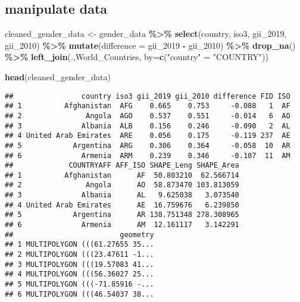 \documentclass[
]{article}
\newenvironment{Shaded}{\begin{snugshade}}{\end{snugshade}}
\newcommand{\AttributeTok}[1]{\textcolor[rgb]{0.13,0.29,0.53}{#1}}
\newcommand{\FunctionTok}[1]{\textcolor[rgb]{0.13,0.29,0.53}{\textbf{#1}}}
\newcommand{\NormalTok}[1]{#1}
\newcommand{\OtherTok}[1]{\textcolor[rgb]{0.56,0.35,0.01}{#1}}
\newcommand{\SpecialCharTok}[1]{\textcolor[rgb]{0.81,0.36,0.00}{\textbf{#1}}}
\newcommand{\StringTok}[1]{\textcolor[rgb]{0.31,0.60,0.02}{#1}}
\begin{document}
\hypertarget{manipulate-data}{%
\subsection{manipulate data}\label{manipulate-data}}

\begin{Shaded}
\begin{Highlighting}[]
\NormalTok{cleaned\_gender\_data }\OtherTok{\textless{}{-}}\NormalTok{ gender\_data }\SpecialCharTok{\%\textgreater{}\%}
  \FunctionTok{select}\NormalTok{(country, iso3, gii\_2019, gii\_2010) }\SpecialCharTok{\%\textgreater{}\%}
  \FunctionTok{mutate}\NormalTok{(}\AttributeTok{difference =}\NormalTok{ gii\_2019 }\SpecialCharTok{{-}}\NormalTok{ gii\_2010) }\SpecialCharTok{\%\textgreater{}\%}
  \FunctionTok{drop\_na}\NormalTok{() }\SpecialCharTok{\%\textgreater{}\%}
  \FunctionTok{left\_join}\NormalTok{(.,World\_Countries, }\AttributeTok{by=}\FunctionTok{c}\NormalTok{(}\StringTok{"country"} \OtherTok{=} \StringTok{"COUNTRY"}\NormalTok{))}

\FunctionTok{head}\NormalTok{(cleaned\_gender\_data)}
\end{Highlighting}
\end{Shaded}

\begin{verbatim}
##                country iso3 gii_2019 gii_2010 difference FID ISO
## 1          Afghanistan  AFG    0.665    0.753     -0.088   1  AF
## 2               Angola  AGO    0.537    0.551     -0.014   6  AO
## 3              Albania  ALB    0.156    0.246     -0.090   2  AL
## 4 United Arab Emirates  ARE    0.056    0.175     -0.119 237  AE
## 5            Argentina  ARG    0.306    0.364     -0.058  10  AR
## 6              Armenia  ARM    0.239    0.346     -0.107  11  AM
##             COUNTRYAFF AFF_ISO SHAPE_Leng SHAPE_Area
## 1          Afghanistan      AF  50.803210  62.566714
## 2               Angola      AO  58.873470 103.813059
## 3              Albania      AL   9.625038   3.073540
## 4 United Arab Emirates      AE  16.759676   6.239850
## 5            Argentina      AR 138.751348 278.308965
## 6              Armenia      AM  12.161117   3.142291
##                         geometry
## 1 MULTIPOLYGON (((61.27655 35...
## 2 MULTIPOLYGON (((23.47611 -1...
## 3 MULTIPOLYGON (((19.57083 41...
## 4 MULTIPOLYGON (((56.36027 25...
## 5 MULTIPOLYGON (((-71.85916 -...
## 6 MULTIPOLYGON (((46.54037 38...
\end{verbatim}
\end{document}

